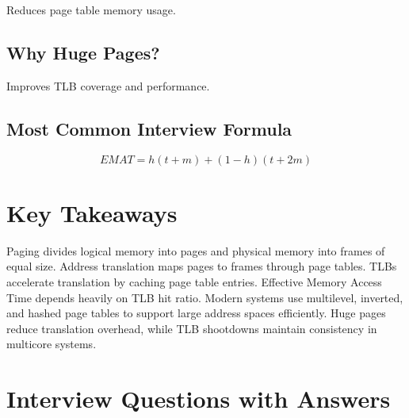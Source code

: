 Reduces page table memory usage.

\subsection{Why Huge Pages?}

Improves TLB coverage and performance.

\subsection{Most Common Interview Formula}

\[
EMAT = h(t+m)+(1-h)(t+2m)
\]

\section{Key Takeaways}

\begin{keytakeaways}
Paging divides logical memory into pages and physical memory into frames of equal size. Address translation maps pages to frames through page tables. TLBs accelerate translation by caching page table entries. Effective Memory Access Time depends heavily on TLB hit ratio. Modern systems use multilevel, inverted, and hashed page tables to support large address spaces efficiently. Huge pages reduce translation overhead, while TLB shootdowns maintain consistency in multicore systems.
\end{keytakeaways}

\section{Interview Questions with Answers}

